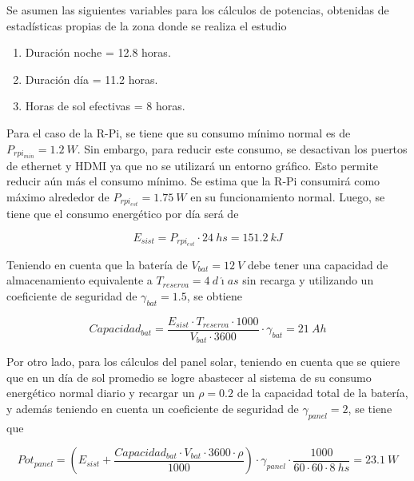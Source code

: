 
Se asumen las siguientes variables para los cálculos de potencias, obtenidas de estadísticas propias de la zona donde se realiza el estudio \cite{ref:weather_bariloche}
\begin{enumerate}
	\item Duración noche = 12.8 horas.
	\item Duración día = 11.2 horas.
	\item Horas de sol efectivas = 8 horas.
\end{enumerate}

Para el caso de la R-Pi, se tiene que su consumo mínimo normal es de $P_{rpi_{min}} = 1.2 \ W$. Sin embargo, para reducir este consumo, se desactivan los puertos de ethernet y HDMI ya que no se utilizará un entorno gráfico. Esto permite reducir aún más el consumo mínimo. Se estima que la R-Pi consumirá como máximo alrededor de $P_{rpi_{est}} = 1.75 \ W$ en su funcionamiento normal\cite{ref:pot_rpi}.
Luego, se tiene que el consumo energético por día será de

\begin{equation}
E_{sist} = P_{rpi_{est}}\cdot 24 \ hs = 151.2 \ kJ
\end{equation}

Teniendo en cuenta que la batería de $V_{bat} = 12 \ V$ debe tener una capacidad de almacenamiento equivalente a $T_{reserva} = 4 \ d\acute{\imath}as$ sin recarga \cite{ref:weather_bariloche} y utilizando un coeficiente de seguridad de $\gamma_{bat} = 1.5$, se obtiene

\begin{equation}
Capacidad_{bat} = \frac{E_{sist}\cdot T_{reserva}\cdot 1000}{V_{bat}\cdot 3600}\cdot \gamma_{bat} = 21 \ Ah
\end{equation}

Por otro lado, para los cálculos del panel solar, teniendo en cuenta que se quiere que en un día de sol promedio se logre abastecer al sistema de su consumo energético normal diario y recargar un $\rho = 0.2$ de la capacidad total de la batería, y además teniendo en cuenta un coeficiente de seguridad de $\gamma_{panel} = 2$, se tiene que

\begin{equation}
Pot_{panel} = \left( E_{sist} + \frac{Capacidad_{bat}\cdot V_{bat}\cdot 3600\cdot \rho}{1000}\right)\cdot \gamma_{panel} \cdot  \frac{1000}{60\cdot 60\cdot 8 \ hs} = 23.1 \ W
\end{equation}

